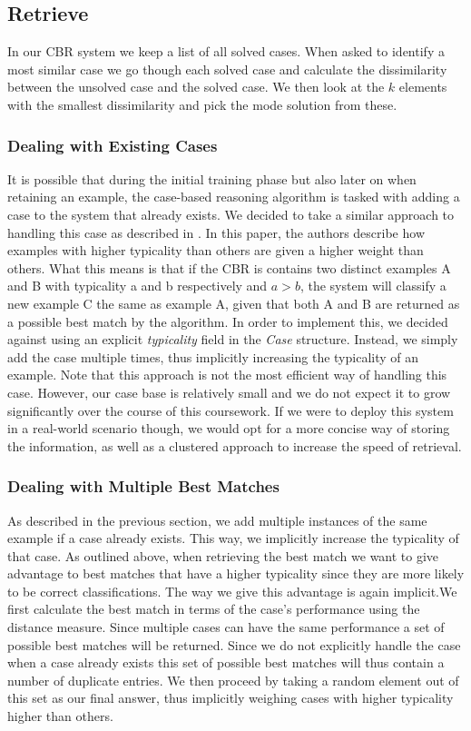 \documentclass[10pt,a4paper]{article}
\begin{document}
\subsection{Retrieve}
In our CBR system we keep a list of all solved cases.
When asked to identify a most similar case we go though each solved case and calculate the dissimilarity between the unsolved case and the solved case.
We then look at the $k$ elements with the smallest dissimilarity and pick the mode solution from these.

\subsubsection{Dealing with Existing Cases}
It is possible that during the initial training phase but also later on when retaining an example, the case-based reasoning algorithm is tasked with adding a case to the system that already exists. We decided to take a similar approach to handling this case as described in \cite{Pantic2004}. In this paper, the authors describe how examples with higher typicality than others are given a higher weight than others. What this means is that if the CBR is contains two distinct examples A and B with typicality a and b respectively and $a > b$, the system will classify a new example C the same as example A, given that both A and B are returned as a possible best match by the algorithm.
In order to implement this, we decided against using an explicit \emph{typicality} field in the \emph{Case} structure. Instead, we simply add the case multiple times, thus implicitly increasing the typicality of an example. Note that this approach is not the most efficient way of handling this case. However, our case base is relatively small and we do not expect it to grow significantly over the course of this coursework. If we were to deploy this system in a real-world scenario though, we would opt for a more concise way of storing the information, as well as a clustered approach to increase the speed of retrieval.

\subsubsection{Dealing with Multiple Best Matches}
As described in the previous section, we add multiple instances of the same example if a case already exists. This way, we implicitly increase the typicality of that case. As outlined above, when retrieving the best match we want to give advantage to best matches that have a higher typicality since they are more likely to be correct classifications. The way we give this advantage is again implicit.We first calculate the best match in terms of the case's performance using the distance measure. Since multiple cases can have the same performance a set of possible best matches will be returned. Since we do not explicitly handle the case when a case already exists this set of possible best matches will thus contain a number of duplicate entries. We then proceed by taking a random element out of this set as our final answer, thus implicitly weighing cases with higher typicality higher than others.
\end{document}
